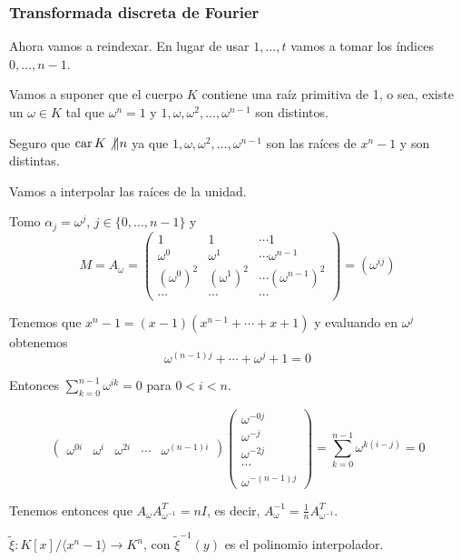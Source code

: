 \subsubsection{Transformada discreta de Fourier}

Ahora vamos a reindexar. En lugar de usar \(1,\ldots, t\)
vamos a tomar los índices \(0,\ldots, n-1\).

Vamos a suponer que el cuerpo \(K\)
contiene una raíz primitiva de 1, o sea,
existe un \(\omega\in K\) tal que \(\omega^n = 1\) y
\(1, \omega, \omega^2,\ldots, \omega^{n-1}\) son distintos.

Seguro que \(\operatorname{car} K \not\| n\) ya que \(1, \omega, \omega^2,\ldots,
\omega^{n-1}\) son las raíces de \(x^n-1\) y son distintas.

Vamos a interpolar las raíces de la unidad.

Tomo \(\alpha_j =\omega^j\), \(j\in\{0,\ldots, n-1\}\) y
\[M=A_\omega=
\begin{pmatrix}
  1&1&\cdots1\\
  \omega^0&\omega^1&\cdots\omega^{n-1}\\
  {(\omega^0)}^2&{(\omega^1)}^2&\cdots{(\omega^{n-1})}^2\\
  \cdots&\cdots&\cdots
\end{pmatrix}= (\omega^{ij})
\]


Tenemos que \(x^n-1=(x-1)(x^{n-1}+\cdots+x+1)\)
y evaluando en \(\omega^{j}\) obtenemos
\[
  \omega^{(n-1)j}+\cdots+\omega^j+1=0
\]

Entonces \(\sum_{k=0}^{n-1}\omega^{ik}=0\) para \(0<i<n\).

\[
  \begin{pmatrix}
  	\omega^{0i}&
    \omega^{i}&
    \omega^{2i}&
    \cdots&
    \omega^{(n-1)i}
  \end{pmatrix}
  \begin{pmatrix}
  	\omega^{-0j}\\
    \omega^{-j}\\
    \omega^{-2j}\\
    \cdots\\
    \omega^{-(n-1)j}
  \end{pmatrix}
  =\sum_{k=0}^{n-1}\omega^{k(i-j)}=0
\]

Tenemos entonces que \(A_\omega A_{\omega^{-1}}^T=nI\),
es decir, \(A^{-1}_\omega=\frac{1}{n}A_{\omega^{-1}}^T\).

\(\tilde{\xi}:K[x]/\langle x^n-1\rangle\longrightarrow K^n\),
con \(\tilde{\xi}^{-1}(y)\) es el polinomio interpolador.

